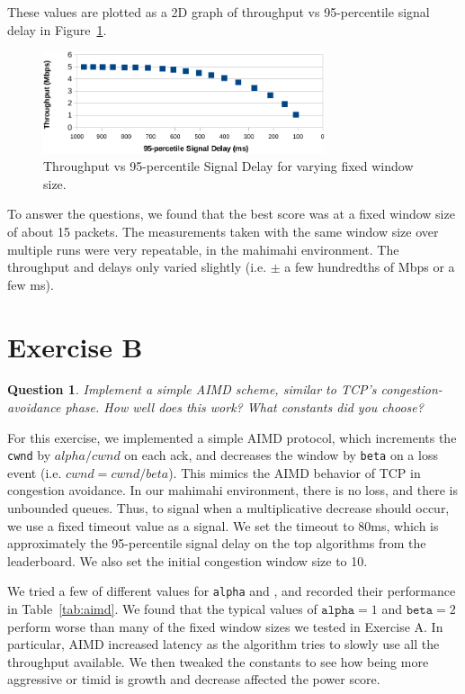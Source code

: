 \documentclass[twoside]{article}
\newtheorem{question}[theorem]{Question}
\begin{document}
These values are plotted as a 2D graph of throughput vs 95-percentile signal
delay in Figure~\ref{fig:throughput_delay}.

\begin{figure}[h]
  \centering
  \includegraphics[height=3cm]{./img/exa_throughput_delay.pdf}
  \caption{Throughput vs 95-percentile Signal Delay for varying fixed window size.}
  \label{fig:throughput_delay}
\end{figure}

To answer the questions, we found that the best score was at a fixed window
size of about 15 packets. The measurements taken with the same window size
over multiple runs were very repeatable, in the mahimahi environment. The
throughput and delays only varied slightly (i.e. $\pm$ a few hundredths of Mbps
or a few ms).

\vfill
\pagebreak

\section*{Exercise B}
\begin{question}
  Implement a simple AIMD scheme, similar to TCP's congestion-avoidance phase.
  How well does this work? What constants did you choose?
\end{question}

For this exercise, we implemented a simple AIMD protocol, which increments the
\texttt{cwnd} by $alpha/cwnd$ on each ack, and decreases the window by
\texttt{beta} on a loss event (i.e. $cwnd = cwnd / beta$).
This mimics the AIMD behavior of TCP in congestion avoidance.
In our mahimahi environment, there is no loss, and there is unbounded queues.
Thus, to signal when a multiplicative decrease should occur, we use a fixed
timeout value as a signal. We set the timeout to 80ms, which is approximately
the 95-percentile signal delay on the top algorithms from the leaderboard.
We also set the initial congestion window size to 10.

We tried a few of different values for \texttt{alpha} and ,
and recorded their performance in Table~\ref{tab:aimd}.
We found that the typical values of $\texttt{alpha} = 1$ and $\texttt{beta} = 2$
perform worse than many of the fixed window sizes we tested in Exercise A.
In particular, AIMD increased latency as the algorithm tries to slowly use
all the throughput available. We then tweaked the constants to see how being
more aggressive or timid is growth and decrease affected the power score.
\end{document}
